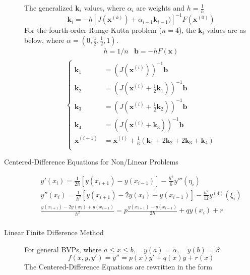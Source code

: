 \documentclass[8pt]{article}
\begin{document}
\begin{multicols}{2}
\begin{description}
    The generalized $\mathbf{k}_i$ values, where $\alpha_i$ are weights and $h=\frac{1}{n}$
    $$ \mathbf{k}_i = -h[J(\mathbf{x}^{(k)})+\alpha_{i-1}\mathbf{k}_{i-1})]^{-1}F(\mathbf{x}^{(0)}) $$
    For the fourth-order Runge-Kutta problem ($n=4$), the $\mathbf{k}_i$ values are as below,
    where $\alpha = (0, \frac{1}{2}, \frac{1}{2}, 1)$.
    \begin{equation*}
      \begin{aligned}
        &h = 1/n & \mathbf{b} =-hF(\mathbf{x})& \\
      \end{aligned}
    \end{equation*}
    \begin{equation*}
      \left\{
        \begin{aligned}
          \mathbf{k}_1 &= (J(\mathbf{x}^{(i)}))^{-1}\mathbf{b} \\
          \mathbf{k}_2 &= (J(\mathbf{x}^{(i)}+\frac{1}{2}\mathbf{k}_1))^{-1}\mathbf{b} \\
          \mathbf{k}_3 &= (J(\mathbf{x}^{(i)}+\frac{1}{2}\mathbf{k}_2))^{-1}\mathbf{b} \\
          \mathbf{k}_4 &= (J(\mathbf{x}^{(i)}+\mathbf{k}_3))^{-1}\mathbf{b} \\
          \mathbf{x}^{(i+1)} &= \mathbf{x}^{(i)} + \frac{1}{6}(\mathbf{k}_1+2\mathbf{k}_2+2\mathbf{k}_3+\mathbf{k}_4) \\
        \end{aligned}
      \right.
    \end{equation*}
  \item[Centered-Difference Equations for Non/Linear Problems] 
    \begin{gather*}
      y'(x_i)=\frac{1}{2h}[y(x_{i+1})-y(x_{i-1})]-\frac{h^2}{6}y'''(\eta_i) \\
      y''(x_i)=\frac{1}{h^2}[y(x_{i+1})-2y(x_i)+y(x_{i-1})]-\frac{h^2}{12}y^{(4)}(\xi_i) \\
      \frac{y(x_{i+1})-2y(x_i)+y(x_{i-1})}{h^2} = p\frac{y(x_{i+1}) - y(x_{i-1})}{2h}+qy(x_i) + r \\
    \end{gather*}
  \item[Linear Finite Difference Method] 
    For general BVPs, where \linebreak[4]
    $a\leq x \leq b,\quad y(a) = \alpha,\quad y(b) = \beta$
    $$f(x,y,y') = y'' = p(x)y' + q(x)y + r(x)$$
    The Centered-Difference Equations are rewritten in the form
    \begin{equation*}

\end{equation*}
\end{description}
\end{multicols}
\end{document}
